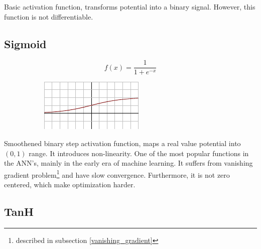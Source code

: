\noindent
Basic activation function, transforms potential into a binary signal. However, this function is not differentiable.
      
\subsection*{Sigmoid}

\begin{figure}[H]
\raggedright
\begin{subfigure}{.28\textwidth}
  \centering
  \[ f(x) = \frac{1}{1 + e^{-x}} \]
\end{subfigure}%
\begin{subfigure}{.25\textwidth}
  \centering
  \includegraphics[width=\textwidth]{tex/images/activation/sigmoid}
\end{subfigure}
\end{figure}

\noindent
Smoothened binary step activation function, maps a real value potential into $(0,1)$ range. It introduces non-linearity. One of the most popular functions in the ANN's, mainly in the early era of machine learning. It suffers from vanishing gradient problem\footnote{described in subsection \ref{vanishing_gradient}} and have slow convergence. Furthermore, it is not zero centered, which make optimization harder.
 
\subsection*{TanH}

